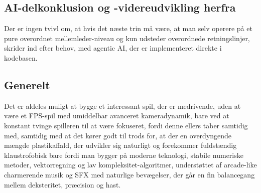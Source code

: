 \subsection{AI-delkonklusion og -videreudvikling herfra}
Der er ingen tvivl om, at hvis det næste trin må være, at man selv operere på et pure overordnet mellemleder-niveau og kun udsteder overordnede retningslinjer, skrider ind efter behov, med agentic AI, der er implementeret direkte i kodebasen.
\subsection{Generelt}
Det er aldeles muligt at bygge et interessant spil, der er medrivende, uden at være et FPS-spil med umiddelbar avanceret kameradynamik, bare ved at konstant tvinge spilleren til at være fokuseret, fordi denne ellers taber samtidig med, samtidig med at det kører godt til trods for, at der en overdyngende mængde plastikaffald, der udvikler sig naturligt og forekommer fuldstændig klaustrofobisk bare fordi man bygger på moderne teknologi, stabile numeriske metoder, vektorregning og lav kompleksitet-algoritmer, understøttet af arcade-like charmerende musik og SFX med naturlige bevægelser, der går en fin balancegang mellem deksteritet, præcision og hast.
